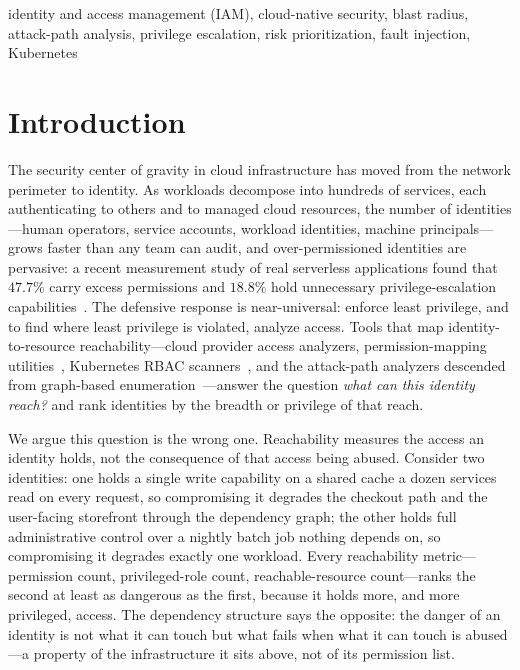 \documentclass[conference]{IEEEtran}
\begin{document}
\begin{IEEEkeywords}
identity and access management (IAM), cloud-native security, blast radius,
attack-path analysis, privilege escalation, risk prioritization, fault injection,
Kubernetes
\end{IEEEkeywords}

\section{Introduction}
The security center of gravity in cloud infrastructure has moved from the network
perimeter to identity. As workloads decompose into hundreds of services, each
authenticating to others and to managed cloud resources, the number of
identities---human operators, service accounts, workload identities, machine
principals---grows faster than any team can audit, and over-permissioned identities
are pervasive: a recent measurement study of real serverless applications found
that $47.7\%$ carry excess permissions and $18.8\%$ hold unnecessary
privilege-escalation capabilities~\cite{overpriv}. The defensive response is
near-universal: enforce least privilege, and to find where least privilege is
violated, analyze access. Tools that map identity-to-resource reachability---cloud
provider access analyzers, permission-mapping utilities~\cite{awsiam}, Kubernetes
RBAC scanners~\cite{kubiscan}, and the attack-path analyzers descended from
graph-based enumeration~\cite{heatray,bloodhound}---answer the question \emph{what
can this identity reach?} and rank identities by the breadth or privilege of that
reach.

We argue this question is the wrong one. Reachability measures the access an
identity holds, not the consequence of that access being abused. Consider two
identities: one holds a single write capability on a shared cache a dozen services
read on every request, so compromising it degrades the checkout path and the
user-facing storefront through the dependency graph; the other holds full
administrative control over a nightly batch job nothing depends on, so compromising
it degrades exactly one workload. Every reachability metric---permission count,
privileged-role count, reachable-resource count---ranks the second at least as
dangerous as the first, because it holds more, and more privileged, access. The
dependency structure says the opposite: the danger of an identity is not what it
can touch but what fails when what it can touch is abused---a property of the
infrastructure it sits above, not of its permission list.
\end{document}
